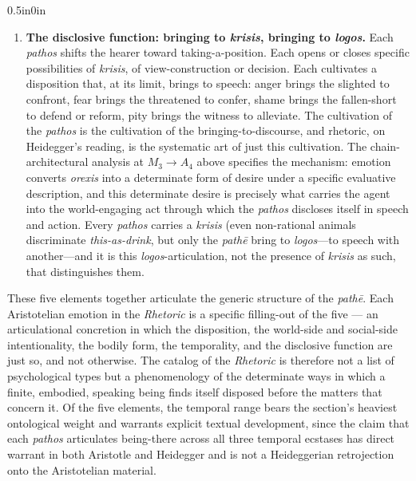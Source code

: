 \documentclass{article}
\begin{document}
\begin{adjustwidth}{0.5in}{0in}
\begin{enumerate}
        \item \textbf{The disclosive function: bringing to \textit{krisis}, bringing to \textit{logos}.} Each \textit{pathos} shifts the hearer toward taking-a-position. Each opens or closes specific possibilities of \textit{krisis}, of view-construction or decision. Each cultivates a disposition that, at its limit, brings to speech: anger brings the slighted to confront, fear brings the threatened to confer, shame brings the fallen-short to defend or reform, pity brings the witness to alleviate. The cultivation of the \textit{pathos} is the cultivation of the bringing-to-discourse, and rhetoric, on Heidegger's reading, is the systematic art of just this cultivation. The chain-architectural analysis at $M_3 \rightarrow A_4$ above specifies the mechanism: emotion converts \textit{orexis} into a determinate form of desire under a specific evaluative description, and this determinate desire is precisely what carries the agent into the world-engaging act through which the \textit{pathos} discloses itself in speech and action. Every \textit{pathos} carries a \textit{krisis} (even non-rational animals discriminate \textit{this-as-drink}, but only the \textit{pathē} bring to \textit{logos}---to speech with another---and it is this \textit{logos}-articulation, not the presence of \textit{krisis} as such, that distinguishes them.
    \end{enumerate}
\end{adjustwidth}

These five elements together articulate the generic structure of the \textit{pathē}. Each Aristotelian emotion in the \textit{Rhetoric} is a specific filling-out of the five --- an articulational concretion in which the disposition, the world-side and social-side intentionality, the bodily form, the temporality, and the disclosive function are just so, and not otherwise. The catalog of the \textit{Rhetoric} is therefore not a list of psychological types but a phenomenology of the determinate ways in which a finite, embodied, speaking being finds itself disposed before the matters that concern it. Of the five elements, the temporal range bears the section's heaviest ontological weight and warrants explicit textual development, since the claim that each \textit{pathos} articulates being-there across all three temporal ecstases has direct warrant in both Aristotle and Heidegger and is not a Heideggerian retrojection onto the Aristotelian material.
\end{document}
